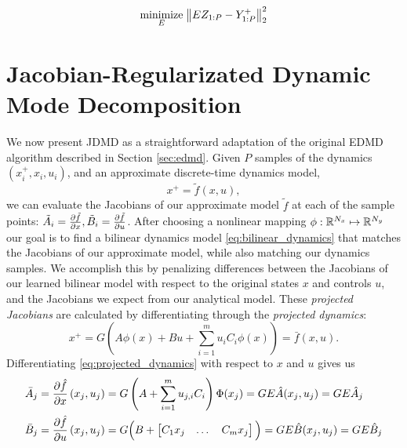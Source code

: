 \documentclass{article}
\begin{document}
\begin{align} \label{opt:edmd}
  \underset{E}{\text{minimize}} \; \norm{E Z_{1:P} - Y_{1:P}^+}_2^2
\end{align}


\section{Jacobian-Regularizated Dynamic Mode Decomposition} \label{sec:jdmd}

We now present JDMD as a straightforward adaptation of the original EDMD algorithm described
in Section \ref{sec:edmd}. Given $P$ samples of the dynamics $(x_i^+, x_i, u_i)$, and an
approximate discrete-time dynamics model,
\begin{equation}
  x^+ = \tilde{f}(x,u),
\end{equation}
we can evaluate the Jacobians of our approximate model $\tilde{f}$ at each of the sample
points: $\tilde{A}_i = \pdv{\tilde{f}}{x}, \tilde{B}_i = \pdv{\tilde{f}}{u}$. After
choosing a nonlinear mapping $\phi : \mathbb{R}^{N_x} \mapsto \mathbb{R}^{N_y}$ our goal is to find a
bilinear dynamics model \eqref{eq:bilinear_dynamics} that matches the Jacobians of our
approximate model, while also matching our dynamics samples. We accomplish this by 
penalizing differences between the Jacobians of our learned bilinear model with respect to 
the original states $x$ and controls $u$, and the Jacobians we expect from our analytical 
model. These \textit{projected Jacobians} are calculated by differentiating through the 
\textit{projected dynamics}:
\begin{equation} \label{eq:projected_dynamics}
  x^+ = G \left( A \phi(x) + B u + \sum_{i=1}^m u_i C_i \phi(x) \right)  = \bar{f}(x,u).
\end{equation}
Differentiating \eqref{eq:projected_dynamics} with respect to $x$ and $u$ gives us
\begin{subequations} \label{eq:projected_jacobians}
  \begin{align}
    \bar{A}_j &= \pdv{\hat{f}}{x}\left(x_j,u_j\right) 
    = G \left(A + \sum_{i=1}^m u_{j,i} C_i \right) \Phi(x_j)
    = G E \hat{A}(x_j,u_j) = G E \hat{A}_j \\
    \bar{B}_j &= \pdv{\hat{f}}{u}\left(x_j,u_j\right) 
    = G \Big(B + \begin{bmatrix} C_1 x_j & \dots & C_m x_j \end{bmatrix} \Big)
    = G E \hat{B}(x_j,u_j) = G E \hat{B}_j
  \end{align}
\end{subequations}
\end{document}
